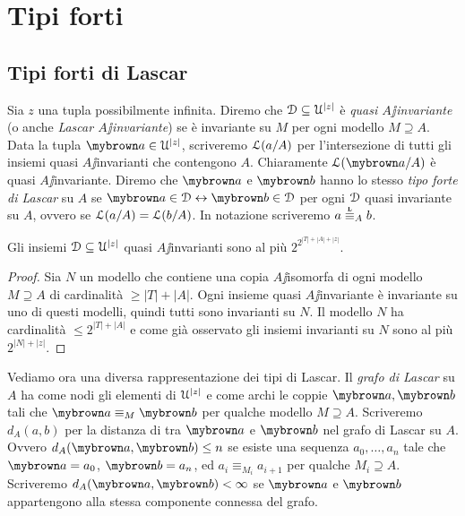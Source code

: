 \chapter{Tipi forti}
\label{tipiforti}

\lavori

\section{Tipi forti di Lascar}
\def\equivL{\stackrel{\smash{\scalebox{.5}{\rm L}}}{\equiv}}

\def\Autf{{\rm Autf}}
Sia $z$  una tupla possibilmente infinita. Diremo che  $\EuScript D\subseteq\EuScript U^{|z|}$ \`e \emph{quasi $A\jj$invariante\/} (o anche \emph{Lascar $A\jj$invariante\/}) se \`e invariante su $M$ per ogni  modello $M\supseteq A$. Data la tupla ${\mr a}\in\U^{|z|}$, scriveremo \emph{$\EuScript L(a/A)$\/} per l'intersezione  di tutti gli insiemi quasi $A\jj$invarianti che contengono $A$. Chiaramente $\Ll({\mr a}/A)$ \`e quasi $A\jj$invariante. Diremo che ${\mr a}$ e ${\mr b}$ hanno lo stesso \emph{tipo forte di Lascar\/} su $A$ se ${\mr a}\in\D\iff{\mr b}\in\D$ per ogni $\EuScript D$ quasi invariante su $A$, ovvero se $\EuScript L(a/A)=\EuScript L(b/A)$. In notazione scriveremo \emph{$a\stackrel{\smash{\scalebox{.5}{\rm\bf L}}}{\equiv}_Ab$}.

\begin{proposition}\label{prop_numero_quasi_invarianti}
 Gli insiemi $\EuScript D\subseteq\EuScript U^{|z|}$ quasi $A\jj$invarianti sono al pi\`u $2^{2^{|T|+|A|+|z|}}$.
\end{proposition}

\begin{proof}
Sia $N$ un modello che contiene una copia $A\jj$isomorfa di ogni modello $M\supseteq A$ di cardinalit\`a $\ge|T|+|A|$. Ogni insieme quasi $A\jj$invariante \`e invariante su uno di questi modelli, quindi tutti sono invarianti su $N$. Il modello $N$ ha cardinalit\`a $\le2^{|T|+|A|}$ e come gi\`a osservato gli insiemi invarianti su $N$ sono al pi\`u $2^{|N|+|z|}$.
\end{proof}


Vediamo ora una diversa rappresentazione dei tipi di Lascar. Il \emph{grafo di Lascar\/} su $A$ ha come nodi gli elementi di $\EuScript U^{|z|}$ e come archi le coppie ${\mr a},{\mr b}$ tali che  ${\mr a}\equiv_M{\mr b}$ per qualche modello $M\supseteq A$. Scriveremo \emph{$d_A(a,b)$\/} per la distanza di tra ${\mr a}$ e ${\mr b}$ nel grafo di Lascar su $A$. Ovvero $d_A({\mr a},{\mr b})\le n$ se esiste una sequenza $a_0,\dots,a_n$ tale che ${\mr a}=a_0$, ${\mr b}=a_n$, ed $a_i\equiv_{M_i}a_{i+1}$ per qualche $M_i\supseteq A$. Scriveremo $d_A({\mr a},{\mr b})<\infty$ se ${\mr a}$ e ${\mr b}$ appartengono alla stessa componente connessa del grafo.

